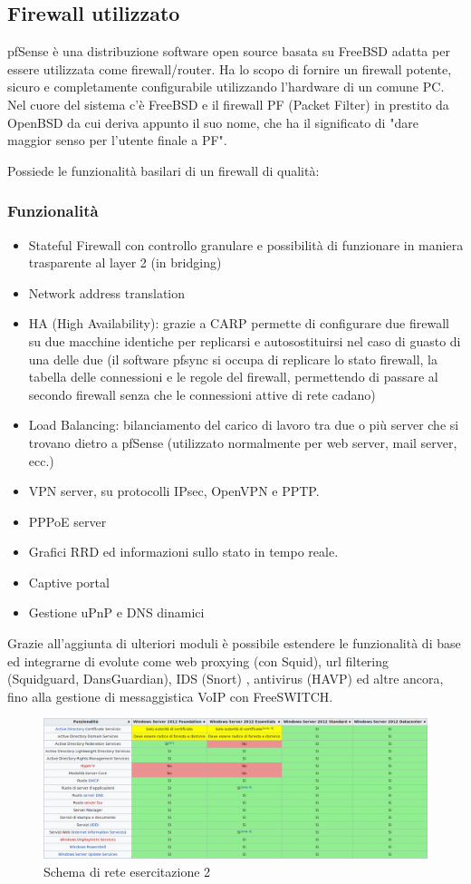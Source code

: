 \documentclass{article}
\begin{document}
\subsection{Firewall utilizzato}
pfSense è una distribuzione software open source basata su FreeBSD adatta per essere utilizzata come firewall/router. 
Ha lo scopo di fornire un firewall potente, sicuro e completamente configurabile utilizzando l'hardware di un comune PC. Nel cuore del sistema c'è FreeBSD e il firewall PF (Packet Filter) in prestito da OpenBSD da cui deriva appunto il suo nome, che ha il significato di "dare maggior senso per l'utente finale a PF".

Possiede le funzionalità basilari di un firewall di qualità:

\subsubsection{Funzionalità}
\begin{itemize}
    \item Stateful Firewall con controllo granulare e possibilità di funzionare in maniera trasparente al layer 2 (in bridging)
    \item Network address translation
    \item HA (High Availability): grazie a CARP permette di configurare due firewall su due macchine identiche per replicarsi e autosostituirsi nel caso di guasto di una delle due (il software pfsync si occupa di replicare lo stato firewall, la tabella delle connessioni e le regole del firewall, permettendo di passare al secondo firewall senza che le connessioni attive di rete cadano)
    \item Load Balancing: bilanciamento del carico di lavoro tra due o più server che si trovano dietro a pfSense (utilizzato normalmente per web server, mail server, ecc.)
    \item VPN server, su protocolli IPsec, OpenVPN e PPTP.
    \item PPPoE server
    \item Grafici RRD ed informazioni sullo stato in tempo reale.
    \item Captive portal
    \item Gestione uPnP e DNS dinamici
\end{itemize}
Grazie all'aggiunta di ulteriori moduli è possibile estendere le funzionalità di base ed integrarne di evolute come web proxying (con Squid), url filtering (Squidguard, DansGuardian), IDS (Snort) , antivirus (HAVP) ed altre ancora, fino alla gestione di messaggistica VoIP con FreeSWITCH. 

\begin{figure}[H]
    \center
    \includegraphics[scale=0.3]{images/tabecomp.png}
    \caption{Schema di rete esercitazione 2}\label{fig:1}
\end{figure}
\end{document}
